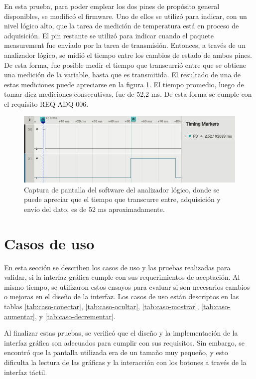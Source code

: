 En esta prueba, para poder emplear los dos pines de propósito general disponibles, se modificó el firmware. Uno de ellos se utilizó para indicar, con un nivel lógico alto, que la tarea de medición de temperatura está en proceso de adquisición. El pin restante se utilizó para indicar cuando el paquete measurement fue envíado por la tarea de transmisión. Entonces, a través de un analizador lógico, se midió el tiempo entre los cambios de estado de ambos pines. De esta forma, fue posible medir el tiempo que transcurrió entre que se obtiene una medición de la variable, hasta que es transmitida. El resultado de una de estas mediciones puede apreciarse en la figura \ref{fig:tiempo-envio}. El tiempo promedio, luego de tomar diez mediciones consecutivas, fue de 52,2 ms. De esta forma se cumple con el requisito REQ-ADQ-006.

\begin{figure}[htpb]
\centering
\includegraphics[width=\textwidth]{./Figures/tiempo-envio.png}
\caption{Captura de pantalla del software del analizador lógico, donde se puede apreciar que el tiempo que transcurre entre, adquisición y envío del dato, es de 52 ms aproximadamente.}
\label{fig:tiempo-envio}
\end{figure}

\section{Casos de uso}

En esta sección se describen los casos de uso y las pruebas realizadas para validar, si la interfaz gráfica cumple con sus requerimientos de aceptación. Al mismo tiempo, se utilizaron estos ensayos para evaluar si son necesarios cambios o mejoras en el diseño de la interfaz. Los casos de uso están descriptos en las tablas  \ref{tab:caso-conectar}, \ref{tab:caso-ocultar}, \ref{tab:caso-mostrar}, \ref{tab:caso-aumentar}, y \ref{tab:caso-decrementar}.

Al finalizar estas pruebas, se verificó que el diseño y la implementación de la interfaz gráfica son adecuados para cumplir con sus requisitos. Sin embargo, se encontró que la pantalla utilizada era de un tamaño muy pequeño, y esto dificulta la lectura de las gráficas y la interacción con los botones a través de la interfaz táctil.

